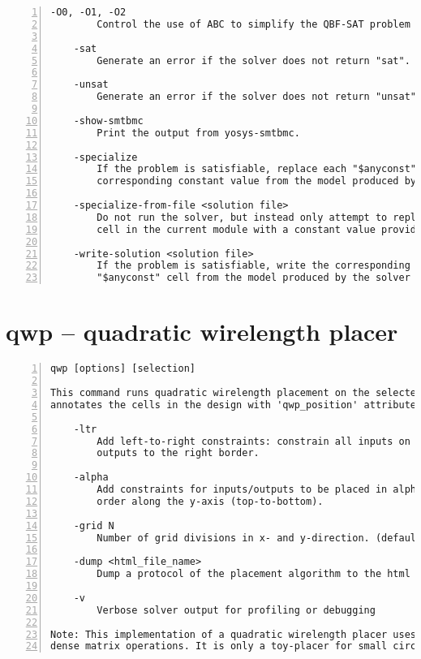 \begin{lstlisting}[numbers=left,frame=single]
    -O0, -O1, -O2
        Control the use of ABC to simplify the QBF-SAT problem before solving.

    -sat
        Generate an error if the solver does not return "sat".

    -unsat
        Generate an error if the solver does not return "unsat".

    -show-smtbmc
        Print the output from yosys-smtbmc.

    -specialize
        If the problem is satisfiable, replace each "$anyconst" cell with its
        corresponding constant value from the model produced by the solver.

    -specialize-from-file <solution file>
        Do not run the solver, but instead only attempt to replace each "$anyconst"
        cell in the current module with a constant value provided by the specified file.

    -write-solution <solution file>
        If the problem is satisfiable, write the corresponding constant value for each
        "$anyconst" cell from the model produced by the solver to the specified file.
\end{lstlisting}

\section{qwp -- quadratic wirelength placer}
\label{cmd:qwp}
\begin{lstlisting}[numbers=left,frame=single]
    qwp [options] [selection]

This command runs quadratic wirelength placement on the selected modules and
annotates the cells in the design with 'qwp_position' attributes.

    -ltr
        Add left-to-right constraints: constrain all inputs on the left border
        outputs to the right border.

    -alpha
        Add constraints for inputs/outputs to be placed in alphanumerical
        order along the y-axis (top-to-bottom).

    -grid N
        Number of grid divisions in x- and y-direction. (default=16)

    -dump <html_file_name>
        Dump a protocol of the placement algorithm to the html file.

    -v
        Verbose solver output for profiling or debugging

Note: This implementation of a quadratic wirelength placer uses exact
dense matrix operations. It is only a toy-placer for small circuits.
\end{lstlisting}

